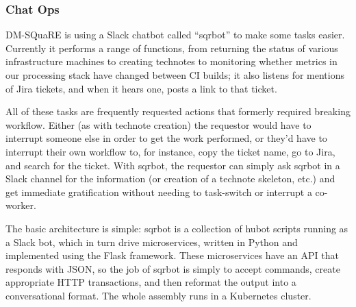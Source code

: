 \subsubsection{Chat Ops}
\label{sec:chatops}

DM-SQuaRE is using a Slack chatbot called ``sqrbot'' to make some tasks
easier. Currently it performs a range of functions, from returning the
status of various infrastructure machines to creating technotes to
monitoring whether metrics in our processing stack have changed between
CI builds; it also listens for mentions of Jira tickets, and when it
hears one, posts a link to that ticket.

All of these tasks are frequently requested actions that formerly
required breaking workflow.  Either (as with technote creation) the
requestor would have to interrupt someone else in order to get the work
performed, or they'd have to interrupt their own workflow to, for
instance, copy the ticket name, go to Jira, and search for the ticket.
With sqrbot, the requestor can simply ask sqrbot in a Slack channel for
the information (or creation of a technote skeleton, etc.) and get
immediate gratification without needing to task-switch or interrupt
a co-worker.

The basic architecture is simple: sqrbot is a collection of hubot
scripts running as a Slack bot, which in turn drive microservices,
written in Python and implemented using the Flask framework.  These
microservices have an API that responds with JSON, so the job of sqrbot
is simply to accept commands, create appropriate HTTP transactions, and
then reformat the output into a conversational format.  The whole
assembly runs in a Kubernetes cluster.
